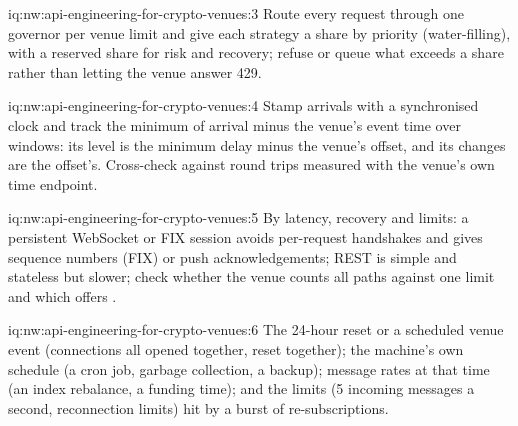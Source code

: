 \begin{solution}{iq:nw:api-engineering-for-crypto-venues:3}
Route every request through one governor per venue limit and give each strategy a share by priority (water-filling), with a reserved share for risk and
recovery; refuse or queue what exceeds a share rather than letting the venue answer 429.
\end{solution}

\begin{solution}{iq:nw:api-engineering-for-crypto-venues:4}
Stamp arrivals with a synchronised clock and track the minimum of arrival minus the venue's event time over windows: its level is the minimum delay minus the
venue's offset, and its changes are the offset's. Cross-check against round trips measured with the venue's own time endpoint.
\end{solution}

\begin{solution}{iq:nw:api-engineering-for-crypto-venues:5}
By latency, recovery and limits: a persistent WebSocket or FIX session avoids per-request handshakes and gives sequence numbers (FIX) or push
acknowledgements; REST is simple and stateless but slower; check whether the venue counts all paths against one limit and which offers .
\end{solution}

\begin{solution}{iq:nw:api-engineering-for-crypto-venues:6}
The 24-hour reset or a scheduled venue event (connections all opened together, reset together); the machine's own schedule (a cron job, garbage
collection, a backup); message rates at that time (an index rebalance, a funding time); and the limits (5 incoming messages a second, reconnection
limits) hit by a burst of re-subscriptions.
\end{solution}
